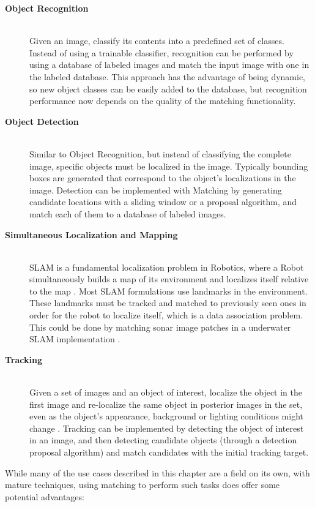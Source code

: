 \begin{description}
	\item[\textbf{Object Recognition}] \hfill \\
		Given an image, classify its contents into a predefined set of classes. Instead of using a trainable classifier, recognition can be performed by using a database of labeled images and match the input image with one in the labeled database. This approach has the advantage of being dynamic, so new object classes can be easily added to the database, but recognition performance now depends on the quality of the matching functionality.
	\item[\textbf{Object Detection}] \hfill \\
		Similar to Object Recognition, but instead of classifying the complete image, specific objects must be localized in the image. Typically bounding boxes are generated that correspond to the object's localizations in the image.
		Detection can be implemented with Matching by generating candidate locations with a sliding window or a proposal algorithm, and match each of them to a database of labeled images.
	\item[\textbf{Simultaneous Localization and Mapping}] \hfill \\
		SLAM is a fundamental localization problem in Robotics, where a Robot simultaneously builds a map of its environment and localizes itself relative to the map \cite{Cadena16tro-SLAMfuture}. Most SLAM formulations use landmarks in the environment. These landmarks must be tracked and matched to previously seen ones in order for the robot to localize itself, which is a data association problem. This could be done by matching sonar image patches in a underwater SLAM implementation \cite[1em]{hidalgo2015review}.
	\item[\textbf{Tracking}] \hfill \\
		Given a set of images and an object of interest, localize the object in the first image and re-localize the same object in posterior images in the set, even as the object's appearance, background or lighting conditions might change \cite{yilmaz2006object}. Tracking can be implemented by detecting the object of interest in an image, and then detecting candidate objects (through a detection proposal algorithm) and match candidates with the initial tracking target.
\end{description}

While many of the use cases described in this chapter are a field on its own, with mature techniques, using matching to perform such tasks does offer some potential advantages:

